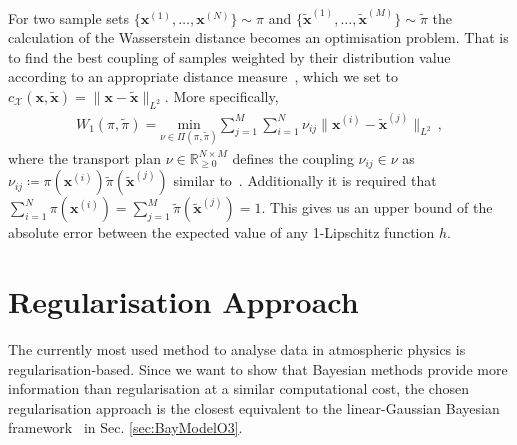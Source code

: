 For two sample sets $\{ \bm{x}^{(1)},\dots,\bm{x}^{(N)}\} \sim \pi$ and $\{\tilde{ \bm{x}}^{(1)},\dots,\tilde{\bm{x}}^{(M)}\} \sim \tilde{\pi}$ the calculation of the Wasserstein distance becomes an optimisation problem.
That is to find the best coupling of samples weighted by their distribution value according to an appropriate distance measure~\cite{feydy2020OT}, which we set to $c_{\mathcal{X}}(\bm{x},\tilde{\bm{x}})= \lVert \bm{x} -\tilde{\bm{x}} \rVert_{L^2} $.
More specifically,
\begin{align}
	W_1(\pi,\tilde{\pi}) = 	\underset{\nu \in \Pi(\pi,\tilde{\pi}) }{\text{min}} \sum^M_{j = 1} \sum^N_{i =1}  \nu_{ij} \lVert\bm{x}^{(i)}  -  \tilde{\bm{x}}^{(j)} \rVert_{L^2} \, , \label{eq:applWasser}
\end{align}
where the transport plan $\nu \in \mathbb{R}^{N \times M}_ {\geq 0}$ defines the coupling $\nu_{ij} \in \nu $ as $ \nu_{ij} \coloneqq \pi(\bm{x}^{(i)}) \tilde{\pi}(\tilde{\bm{x}}^{(j)})$ similar to~\cite[Eq. 3.166]{feydy2020OT}.
Additionally it is required that $\sum^N_{i =1} \pi(\bm{x}^{(i)}) = \sum^M_{j = 1} \tilde{\pi}(\tilde{\bm{x}}^{(j)})= 1 $.
This gives us an upper bound of the absolute error between the expected value of any 1-Lipschitz function $h$.


\clearpage
\section{Regularisation Approach}
\label{sec:reg}

The currently most used method to analyse data in atmospheric physics is regularisation-based.
Since we want to show that Bayesian methods provide more information than regularisation at a similar computational cost, the chosen regularisation approach is the closest equivalent to the linear-Gaussian Bayesian framework~\cite{fox2016fast} in Sec. \ref{sec:BayModelO3}.

